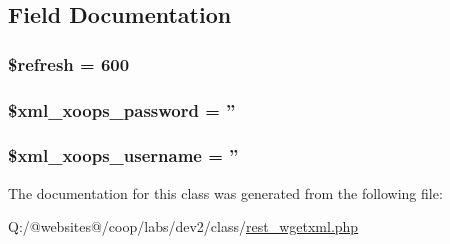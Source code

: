 \subsection{Field Documentation}
\hypertarget{class_r_e_s_t___w_g_e_t_x_m_l_xortify_exchange_a8527f826b6959aaa92b0e51ee427ba1a}{
\subsubsection[{\$refresh}]{\setlength{\rightskip}{0pt plus 5cm}\$refresh = 600}}\label{class_r_e_s_t___w_g_e_t_x_m_l_xortify_exchange_a8527f826b6959aaa92b0e51ee427ba1a}
\hypertarget{class_r_e_s_t___w_g_e_t_x_m_l_xortify_exchange_a8ec2889165c837354fded1cedbd42157}{
\subsubsection[{\$xml\-\_\-xoops\-\_\-password}]{\setlength{\rightskip}{0pt plus 5cm}\$xml\-\_\-xoops\-\_\-password = ''}}\label{class_r_e_s_t___w_g_e_t_x_m_l_xortify_exchange_a8ec2889165c837354fded1cedbd42157}
\hypertarget{class_r_e_s_t___w_g_e_t_x_m_l_xortify_exchange_a725df0dd6b578e15522ed15945e5901c}{
\subsubsection[{\$xml\-\_\-xoops\-\_\-username}]{\setlength{\rightskip}{0pt plus 5cm}\$xml\-\_\-xoops\-\_\-username = ''}}\label{class_r_e_s_t___w_g_e_t_x_m_l_xortify_exchange_a725df0dd6b578e15522ed15945e5901c}


The documentation for this class was generated from the following file\-:\begin{DoxyCompactItemize}
\item 
Q\-:/@websites@/coop/labs/dev2/class/\hyperlink{rest__wgetxml_8php}{rest\-\_\-wgetxml.\-php}\end{DoxyCompactItemize}
